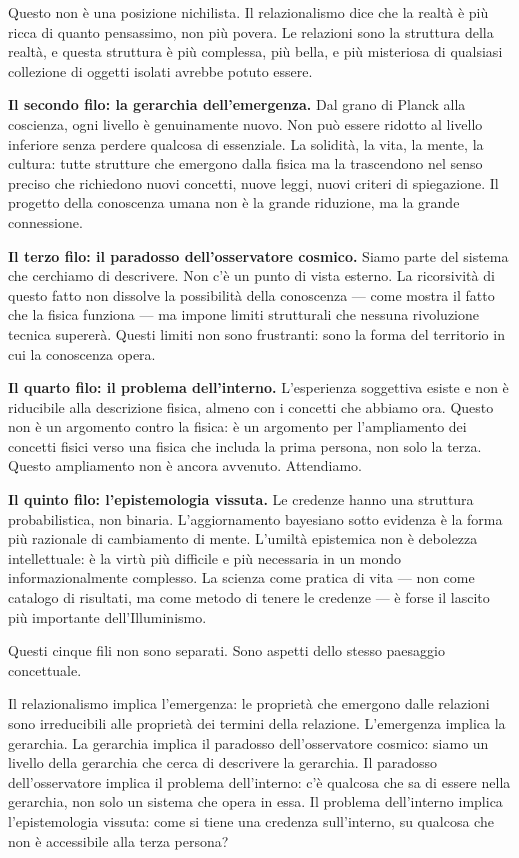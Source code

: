 \documentclass[12pt,a4paper,openany]{book}
\begin{document}
Questo non è una posizione nichilista. Il relazionalismo dice che la realtà è più ricca di quanto pensassimo, non più povera. Le relazioni sono la struttura della realtà, e questa struttura è più complessa, più bella, e più misteriosa di qualsiasi collezione di oggetti isolati avrebbe potuto essere.

\textbf{Il secondo filo: la gerarchia dell'emergenza.} Dal grano di Planck alla coscienza, ogni livello è genuinamente nuovo. Non può essere ridotto al livello inferiore senza perdere qualcosa di essenziale. La solidità, la vita, la mente, la cultura: tutte strutture che emergono dalla fisica ma la trascendono nel senso preciso che richiedono nuovi concetti, nuove leggi, nuovi criteri di spiegazione. Il progetto della conoscenza umana non è la grande riduzione, ma la grande connessione.

\textbf{Il terzo filo: il paradosso dell'osservatore cosmico.} Siamo parte del sistema che cerchiamo di descrivere. Non c'è un punto di vista esterno. La ricorsività di questo fatto non dissolve la possibilità della conoscenza --- come mostra il fatto che la fisica funziona --- ma impone limiti strutturali che nessuna rivoluzione tecnica supererà. Questi limiti non sono frustranti: sono la forma del territorio in cui la conoscenza opera.

\textbf{Il quarto filo: il problema dell'interno.} L'esperienza soggettiva esiste e non è riducibile alla descrizione fisica, almeno con i concetti che abbiamo ora. Questo non è un argomento contro la fisica: è un argomento per l'ampliamento dei concetti fisici verso una fisica che includa la prima persona, non solo la terza. Questo ampliamento non è ancora avvenuto. Attendiamo.

\textbf{Il quinto filo: l'epistemologia vissuta.} Le credenze hanno una struttura probabilistica, non binaria. L'aggiornamento bayesiano sotto evidenza è la forma più razionale di cambiamento di mente. L'umiltà epistemica non è debolezza intellettuale: è la virtù più difficile e più necessaria in un mondo informazionalmente complesso. La scienza come pratica di vita --- non come catalogo di risultati, ma come metodo di tenere le credenze --- è forse il lascito più importante dell'Illuminismo.

\medskip

Questi cinque fili non sono separati. Sono aspetti dello stesso paesaggio concettuale.

Il relazionalismo implica l'emergenza: le proprietà che emergono dalle relazioni sono irreducibili alle proprietà dei termini della relazione. L'emergenza implica la gerarchia. La gerarchia implica il paradosso dell'osservatore cosmico: siamo un livello della gerarchia che cerca di descrivere la gerarchia. Il paradosso dell'osservatore implica il problema dell'interno: c'è qualcosa che sa di essere nella gerarchia, non solo un sistema che opera in essa. Il problema dell'interno implica l'epistemologia vissuta: come si tiene una credenza sull'interno, su qualcosa che non è accessibile alla terza persona?
\end{document}
